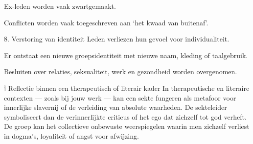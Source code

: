 Ex-leden worden vaak zwartgemaakt.

Conflicten worden vaak toegeschreven aan ‘het kwaad van buitenaf’.

8. Verstoring van identiteit
Leden verliezen hun gevoel voor individualiteit.

Er ontstaat een nieuwe groepsidentiteit met nieuwe naam, kleding of taalgebruik.

Besluiten over relaties, seksualiteit, werk en gezondheid worden overgenomen.

🕯 Reflectie binnen een therapeutisch of literair kader
In therapeutische en literaire contexten — zoals bij jouw werk — kan een sekte fungeren als metafoor voor innerlijke slavernij of de verleiding van absolute waarheden. De sekteleider symboliseert dan de verinnerlijkte criticus of het ego dat zichzelf tot god verheft. De groep kan het collectieve onbewuste weerspiegelen waarin men zichzelf verliest in dogma's, loyaliteit of angst voor afwijzing.
